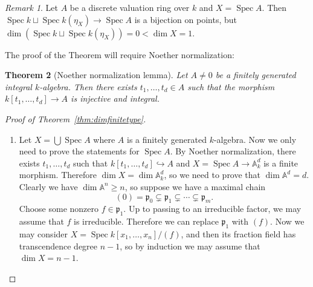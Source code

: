 \documentclass[leqno, openany]{memoir}
\newtheorem{thm}{Theorem}[section]
\theoremstyle{definition}
\theoremstyle{remark}
\newtheorem{rmk}[thm]{Remark}
\theoremstyle{plain}
\theoremstyle{definition}
\theoremstyle{remark}
\newcommand{\A}{\mathbb{A}}
\newcommand{\mf}[1]{\mathfrak{#1}}
\DeclareMathOperator{\Spec}{Spec}
\begin{document}
\begin{rmk} Let $A$ be a discrete valuation ring over $k$ and $X = \Spec A$.
Then $\Spec k \sqcup \Spec k(\eta_X) \to \Spec A$ is a bijection on points, but
$\dim (\Spec k \sqcup \Spec k(\eta_X)) = 0 < \dim X = 1$.  \end{rmk}

The proof of the Theorem will require Noether normalization:
\begin{thm}[Noether normalization lemma] Let $A \neq 0$ be a finitely generated
    integral $k$-algebra. Then there exists $t_1, \ldots, t_d \in A$ such that
    the morphism $k[t_1, \ldots, t_d] \to A$ is injective and integral.
\end{thm}

\begin{proof}[Proof of Theorem~\ref{thm:dimfinitetype}]\leavevmode
    \begin{enumerate} \item Let $X = \bigcup \Spec A$ where $A$ is a finitely
        generated $k$-algebra. Now we only need to prove the statements for
        $\Spec A$. By Noether normalization, there exists $t_1, \ldots, t_d$
        such that $k[t_1, \ldots, t_d] \hookrightarrow A$ and $X = \Spec A \to
        \A_k^d$ is a finite morphism. Therefore $\dim X = \dim \A^d_k$, so we
        need to prove that $\dim \A^d = d$. Clearly we have $\dim \A^n \geq n$,
        so suppose we have a maximal chain \[ (0) = \mf{p}_0 \subsetneq
        \mf{p}_1 \subsetneq \cdots \subsetneq \mf{p}_m. \] Choose some nonzero
        $f \in \mf{p}_1$. Up to passing to an irreducible factor, we may assume
        that $f$ is irreducible. Therefore we can replace $\mf{p}_1$ with
        $(f)$. Now we may consider $X = \Spec k[x_1, \ldots, x_n]/(f)$, and
        then its fraction field has transcendence degree $n-1$, so by induction
        we may assume that $\dim X = n-1$.


\end{enumerate}
\end{proof}
\end{document}
